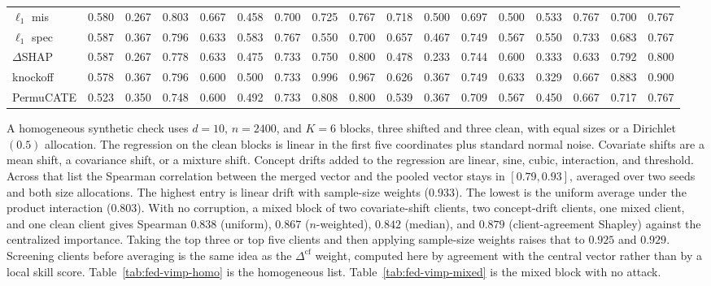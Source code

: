 \begin{table}[t]
{\begin{tabular}{l rrrr rrrr rrrr rrrr}
\(\ell_1\) mis & 0.580 & 0.267 & 0.803 & 0.667 & 0.458 & 0.700 & 0.725 & 0.767 & 0.718 & 0.500 & 0.697 & 0.500 & 0.533 & 0.767 & 0.700 & 0.767 \\
\(\ell_1\) spec & 0.587 & 0.367 & 0.796 & 0.633 & 0.583 & 0.767 & 0.550 & 0.700 & 0.657 & 0.467 & 0.749 & 0.567 & 0.550 & 0.733 & 0.683 & 0.767 \\
\(\Delta\)SHAP & 0.587 & 0.267 & 0.778 & 0.633 & 0.475 & 0.733 & 0.750 & 0.800 & 0.478 & 0.233 & 0.744 & 0.600 & 0.333 & 0.633 & 0.792 & 0.800 \\
knockoff & 0.578 & 0.367 & 0.796 & 0.600 & 0.500 & 0.733 & 0.996 & 0.967 & 0.626 & 0.367 & 0.749 & 0.633 & 0.329 & 0.667 & 0.883 & 0.900 \\
PermuCATE & 0.523 & 0.350 & 0.748 & 0.600 & 0.492 & 0.733 & 0.808 & 0.800 & 0.539 & 0.367 & 0.709 & 0.567 & 0.450 & 0.667 & 0.717 & 0.767 \\
\bottomrule
\end{tabular}}
\end{table}

A homogeneous synthetic check uses \(d=10\), \(n=2400\), and \(K=6\)
blocks, three shifted and three clean, with equal sizes or a
Dirichlet\((0.5)\) allocation.
The regression on the clean blocks is linear in the first five coordinates
plus standard normal noise.
Covariate shifts are a mean shift, a covariance shift, or a mixture shift.
Concept drifts added to the regression are linear, sine, cubic,
interaction, and threshold.
Across that list the Spearman correlation between the merged vector and
the pooled vector stays in \([0.79,0.93]\), averaged over two seeds and
both size allocations.
The highest entry is linear drift with sample-size weights (\(0.933\)).
The lowest is the uniform average under the product interaction
(\(0.803\)).
With no corruption, a mixed block of two covariate-shift clients, two
concept-drift clients, one mixed client, and one clean client gives
Spearman \(0.838\) (uniform), \(0.867\) (\(n\)-weighted), \(0.842\)
(median), and \(0.879\) (client-agreement Shapley) against the centralized
importance.
Taking the top three or top five clients and then applying sample-size
weights raises that to \(0.925\) and \(0.929\).
Screening clients before averaging is the same idea as the
\(\Delta^{\mathrm{cf}}\) weight, computed here by agreement with the
central vector rather than by a local skill score.
Table~\ref{tab:fed-vimp-homo} is the homogeneous list.
Table~\ref{tab:fed-vimp-mixed} is the mixed block with no attack.

